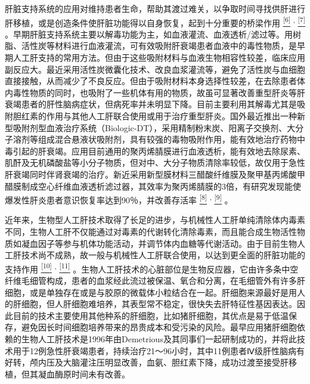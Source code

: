 肝脏支持系统的应用对维持患者生命，帮助其渡过难关，以争取时间寻找供肝进行肝移植，或是创造条件使肝脏功能得以自身恢复，起到十分重要的桥梁作用
\protect\hyperlink{text00019.htmlux5cux23ch6-18}{\textsuperscript{{[}6{]}}}
\textsuperscript{,}
\protect\hyperlink{text00019.htmlux5cux23ch7-18}{\textsuperscript{{[}7{]}}}
。早期肝脏支持系统主要以解毒功能为主，如血液灌流、血液透析/滤过等。用树脂、活性炭等材料进行血液灌流，可有效吸附肝衰竭患者血液中的毒性物质，是早期人工肝支持的常用方法。但由于这些吸附材料与血液生物相容性较差，临床应用副反应大。最近采用活性炭微囊化技术、改良血浆灌流等，避免了活性炭与血细胞直接接触，从而减少了不良反应。但由于吸附材料本身选择性较差，在去除患者体内毒性物质的同时，也吸附了一些机体有用的物质，故虽可显著改善重型肝炎等肝衰竭患者的肝性脑病症状，但病死率并未明显下降。目前主要利用其解毒尤其是吸附胆红素的作用与其他人工肝联合使用或用于治疗重型肝炎。国外最近推出一种新型吸附剂型血液治疗系统（Biologic-DT），采用精制粉末炭、阳离子交换剂、大分子溶剂等组成混合悬液状吸附剂，具有较强的毒物吸附作用，能有效地治疗药物中毒引起的肝衰竭。应用目前通用的聚丙烯腈膜进行血液透析，能有效地去除尿素、肌酐及无机磷酸盐等小分子物质，但对中、大分子物质清除率较低，故仅用于急性肝衰竭同时伴肾衰竭的治疗。新近采用新型膜材料三醋酸纤维膜及聚甲基丙烯酸甲醋膜制成空心纤维血液透析滤过器，其效率为聚丙烯腈膜的3倍，有研究发现能使爆发性肝炎患者意识恢复率达到90％，并改善存活率
\protect\hyperlink{text00019.htmlux5cux23ch8-18}{\textsuperscript{{[}8{]}}}
\textsuperscript{,}
\protect\hyperlink{text00019.htmlux5cux23ch9-18}{\textsuperscript{{[}9{]}}}
。

近年来，生物型人工肝技术取得了长足的进步，与机械性人工肝单纯清除体内毒素不同，生物人工肝不仅能通过对毒素的代谢转化清除毒素，而且能合成生物活性物质如凝血因子等参与机体功能活动，并调节体内血糖等代谢活动。由于目前生物人工肝技术尚不成熟，故一般与机械性人工肝联合使用，以达到更全面的肝脏功能的支持作用
\protect\hyperlink{text00019.htmlux5cux23ch10-18}{\textsuperscript{{[}10{]}}}
\textsuperscript{,}
\protect\hyperlink{text00019.htmlux5cux23ch11-18}{\textsuperscript{{[}11{]}}}
。生物人工肝技术的心脏部位是生物反应器，它由许多条中空纤维毛细管构成，患者的血浆经此流过被保温、氧合和分离，在毛细管外有许多肝细胞，或是单独存在或是与胶原的微载体小粒结合在一起。肝细胞来源最好是用人的肝细胞，但人肝细胞难培养，其表型常不稳定，很快失去肝特征性基因表达。因此目前的技术主要使用其他种系的肝细胞，比如猪肝细胞，其优点是易于低温保存，避免因长时间细胞培养带来的昂贵成本和受污染的风险。最早应用猪肝细胞依赖的生物人工肝技术是1996年由Demetrious及其同事们一起研制成功的，并将此技术用于12例急性肝衰竭患者，持续治疗21～96小时，其中11例患者Ⅳ级肝性脑病有好转，颅内压及大脑灌注压明显改善，血氨、胆红素下降，成功过渡至接受肝移植，但其凝血酶原时间未有改善。

